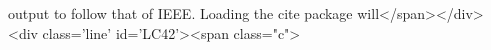 \cite{} output to follow that of IEEE. Loading the cite package will</span></div><div class='line' id='LC42'><span class="c">%